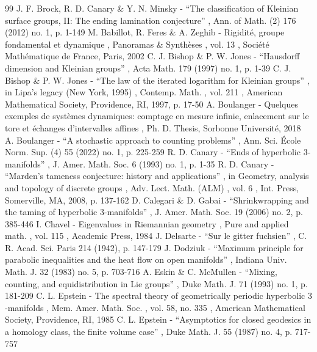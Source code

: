 \begin{thebibliography}{99}
 J. F. Brock, R. D. Canary \& Y. N. Minsky - “The classification of Kleinian surface groups, II: The ending lamination conjecture” , Ann. of Math. (2) 176 (2012) no. 1, p. 1-149
 M. Babillot, R. Feres \& A. Zeghib - Rigidité, groupe fondamental et dynamique , Panoramas \& Synthèses , vol. 13 , Société Mathématique de France, Paris, 2002
 C. J. Bishop \& P. W. Jones - “Hausdorff dimension and Kleinian groups” , Acta Math. 179 (1997) no. 1, p. 1-39
 C. J. Bishop \& P. W. Jones - “The law of the iterated logarithm for Kleinian groups” , in Lipa’s legacy (New York, 1995) , Contemp. Math. , vol. 211 , American Mathematical Society, Providence, RI, 1997, p. 17-50
 A. Boulanger - Quelques exemples de systèmes dynamiques: comptage en mesure infinie, enlacement sur le tore et échanges d’intervalles affines , Ph. D. Thesis, Sorbonne Université, 2018
 A. Boulanger - “A stochastic approach to counting problems” , Ann. Sci. École Norm. Sup. (4) 55 (2022) no. 1, p. 225-259
 R. D. Canary - “Ends of hyperbolic $3$-manifolds” , J. Amer. Math. Soc. 6 (1993) no. 1, p. 1-35
 R. D. Canary - “Marden’s tameness conjecture: history and applications” , in Geometry, analysis and topology of discrete groups , Adv. Lect. Math. (ALM) , vol. 6 , Int. Press, Somerville, MA, 2008, p. 137-162
 D. Calegari \& D. Gabai - “Shrinkwrapping and the taming of hyperbolic 3-manifolds” , J. Amer. Math. Soc. 19 (2006) no. 2, p. 385-446
 I. Chavel - Eigenvalues in Riemannian geometry , Pure and applied math. , vol. 115 , Academic Press, 1984
 J. Delsarte - “Sur le gitter fuchsien” , C. R. Acad. Sci. Paris 214 (1942), p. 147-179
 J. Dodziuk - “Maximum principle for parabolic inequalities and the heat flow on open manifolds” , Indiana Univ. Math. J. 32 (1983) no. 5, p. 703-716
 A. Eskin \& C. McMullen - “Mixing, counting, and equidistribution in Lie groups” , Duke Math. J. 71 (1993) no. 1, p. 181-209
 C. L. Epstein - The spectral theory of geometrically periodic hyperbolic $3$-manifolds , Mem. Amer. Math. Soc. , vol. 58, no. 335 , American Mathematical Society, Providence, RI, 1985
 C. L. Epstein - “Asymptotics for closed geodesics in a homology class, the finite volume case” , Duke Math. J. 55 (1987) no. 4, p. 717-757

\end{thebibliography}
